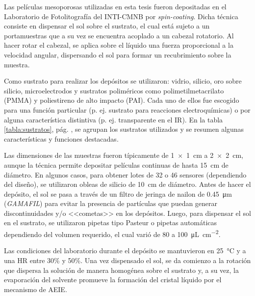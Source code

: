 			Las películas mesoporosas utilizadas en esta tesis fueron depositadas en el Laboratorio de Fotolitografía del INTI-CMNB por \textit{spin-coating}. Dicha técnica consiste en 
			dispensar el sol sobre el sustrato, el cual está sujeto a un portamuestras que a su vez se encuentra acoplado a un cabezal rotatorio. Al hacer rotar el cabezal, se aplica sobre el líquido una fuerza proporcional a la velocidad angular, dispersando el sol para formar un recubrimiento sobre la muestra.

			Como sustrato para realizar los depósitos se utilizaron: vidrio, silicio, oro sobre silicio, microelectrodos y sustratos poliméricos como  polimetilmetacrilato (PMMA) y poliestireno de alto impacto (PAI). Cada uno de ellos fue escogido para una función particular (p. ej. sustrato para reacciones electroquímicas) o por alguna característica distintiva (p. ej. transparente en el IR). En la tabla \ref{tabla:sustratos}, pág. \pageref{tabla:sustratos}, se agrupan los sustratos utilizados y se resumen algunas características y funciones destacadas.

			Las dimensiones de las muestras fueron típicamente de \SI{1x1}{\cm} a \linebreak \SI{2x2}{\cm}, aunque la técnica permite depositar películas continuas de hasta \SI{15}{cm} de diámetro. En algunos casos, para obtener lotes de 32 o 46 sensores (dependiendo del diseño), se utilizaron obleas de silicio de \SI{10}{\cm} de diámetro. Antes de hacer el depósito, el sol se pasa a través de un filtro de jeringa de nailon de \SI{0.45}{\um} (\textit{GAMAFIL}) para evitar la presencia de partículas que puedan generar discontinuidades y/o <<cometas>> en los depósitos\cite{Franssila2004}. Luego, para dispensar el sol en el sustrato, se utilizaron pipetas tipo Pasteur o pipetas automáticas dependiendo del volumen requerido, el cual varió de 80 a \SI{100}{\uL.\cm^{-2}}. 

			Las condiciones del laboratorio durante el depósito se mantuvieron en \SI{25}{\celsius} y a una HR entre 30\% y 50\%. Una vez dispensado el sol, se da comienzo a la rotación que dispersa la solución de manera homogénea sobre el sustrato y, a su vez, la evaporación del solvente promueve la formación del cristal líquido por el mecanismo de AEIE\cite{Brinker1999}.



